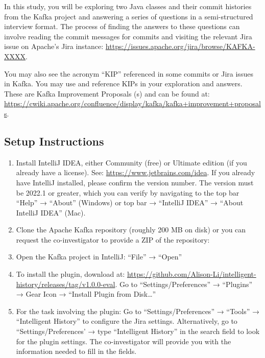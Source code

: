 In this study, you will be exploring two Java classes and their commit histories from the Kafka project and answering a series of questions in a semi-structured interview format. The process of finding the answers to these questions can involve reading the commit messages for commits and visiting the relevant Jira issue on Apache’s Jira instance:
\url{https://issues.apache.org/jira/browse/KAFKA-XXXX}.

You may also see the acronym ``KIP'' referenced in some commits or Jira issues in Kafka. You may use and reference KIPs in your exploration and answers. These are Kafka Improvement Proposals (s) and can be found at: 
\url{https://cwiki.apache.org/confluence/display/kafka/kafka+improvement+proposals}.

\subsection{Setup Instructions}
\label{sec:Setup-Instructions}

\begin{enumerate}
    \item Install IntelliJ IDEA, either Community (free) or Ultimate edition (if you already have a license). See: \url{https://www.jetbrains.com/idea}. If you already have IntelliJ installed, please confirm the version number. The version must be 2022.1 or greater, which you can verify by navigating to the top bar  ``Help'' → ``About'' (Windows) or top bar → ``IntelliJ IDEA'' → ``About IntelliJ IDEA'' (Mac).
    \item Clone the Apache Kafka repository (roughly 200 MB on disk) or you can request the co-investigator to provide a ZIP of the repository: 
    
    \begin{center}
    \end{center}

    \item Open the Kafka project in IntelliJ: ``File'' → ``Open''
    \item To install the plugin, download  at: \url{https://github.com/Alison-Li/intelligent-history/releases/tag/v1.0.0-eval}. Go to “Settings/Preferences” → ``Plugins'' → Gear Icon → ``Install Plugin from Disk\dots''
    \item For the task involving the plugin: Go to ``Settings/Preferences'' → ``Tools'' → ``Intelligent History'' to configure the Jira settings. Alternatively, go to “Settings/Preferences’ → type ``Intelligent History'' in the search field to look for the plugin settings. The co-investigator will provide you with the information needed to fill in the fields.
\end{enumerate}

